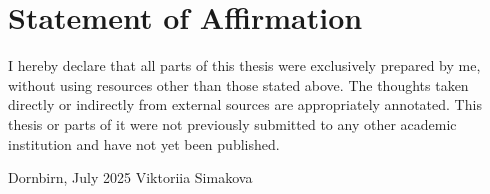 \documentclass[a4paper,12pt,twoside]{scrreprt}
\begin{document}
\clearpage
{}
{}
\printbibliography


\chapter*{Statement of Affirmation}
I hereby declare that all parts of this thesis were exclusively prepared by me, without using resources other than those stated above. The thoughts taken directly or indirectly from external sources are appropriately annotated. This thesis or parts of it were not previously submitted to any other academic institution and have not yet been published.

\vspace{3cm}
\noindent
Dornbirn, July 2025 \hfill Viktoriia Simakova
\end{document}
